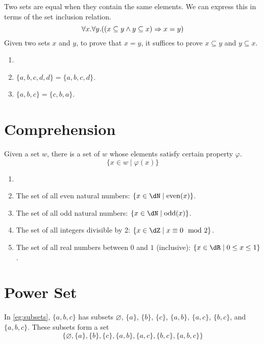 \documentclass{amsart}
\begin{document}
Two sets are equal when they contain the same elements.
We can express this in terms of the set inclusion relation.
\[
  \forall x. \forall y. ((x \subseteq y \wedge y \subseteq x) \Rightarrow x = y)
\]
Given two sets $x$ and $y$, to prove that $x = y$, it suffices to prove $x \subseteq y$ and $y \subseteq x$.

\begin{eg}
  \begin{enumerate}
  \item[]
  \item $\{a,b,c,d,d\} = \{a,b,c,d\}$.
  \item $\{a,b,c\} = \{c,b,a\}$.
  \end{enumerate}
\end{eg}

\section{Comprehension}
\label{sec:comprehension}

Given a set $w$, there is a set of $w$ whose elements satisfy certain property $\varphi$.
\[
  \{ x \in w \mid \varphi(x) \}
\]

\begin{eg}
  \begin{enumerate}
  \item[]
  \item The set of all even natural numbers: $\{ x \in \dN \mid \mathrm{even}(x) \}$.
  \item The set of all odd natural numbers: $\{ x \in \dN \mid \mathrm{odd}(x) \}$.
  \item The set of all integers divisible by 2: $\{ x \in \dZ \mid x \cng 0 \mod 2 \}$.
  \item The set of all real numbers between $0$ and $1$ (inclusive): $\{ x \in \dR \mid 0 \leq x \leq 1 \}$.
  \end{enumerate}
\end{eg}

\section{Power Set}
\label{sec:power-set}

In \cref{eg:subsets}, $\{ a,b,c \}$ has subsets $\varnothing$, $\{ a \}$, $\{ b \}$, $\{ c \}$, $\{ a,b \}$, $\{ a,c \}$, $\{ b,c \}$, and $\{ a,b,c \}$.
These subsets form a set
\[
  \{ \varnothing, \{ a \}, \{ b \}, \{ c \}, \{ a,b \}, \{ a,c \}, \{ b,c \}, \{ a,b,c \} \}
\]
\end{document}
